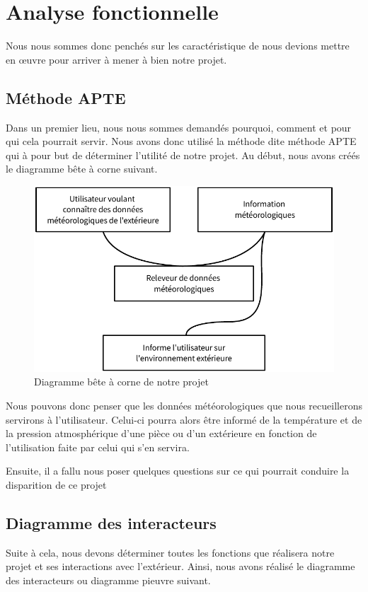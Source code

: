 \section{Analyse fonctionnelle}

Nous nous sommes donc penchés sur les caractéristique de nous devions mettre en œuvre pour arriver à mener à bien notre projet.

\subsection{Méthode APTE}

Dans un premier lieu, nous nous sommes demandés pourquoi, comment et pour qui cela pourrait servir. Nous avons donc utilisé la méthode dite \og méthode APTE \fg qui à pour but de déterminer l'utilité de notre projet. Au début, nous avons créés le diagramme bête à corne suivant.

\begin{figure}[!h]
	\centering
	\includegraphics[width=.6\linewidth]{Images/Diagramme_APTE}
	\caption{Diagramme bête à corne de notre projet}
\end{figure}

Nous pouvons donc penser que les données météorologiques que nous recueillerons servirons à l'utilisateur. Celui-ci pourra alors être informé de la température et de la pression atmosphérique d'une pièce ou d'un extérieure en fonction de l'utilisation faite par celui qui s'en servira.

Ensuite, il a fallu nous poser quelques questions sur ce qui pourrait conduire la disparition de ce projet

\subsection{Diagramme des interacteurs}

Suite à cela, nous devons déterminer toutes les fonctions que réalisera notre projet et ses interactions avec l'extérieur. Ainsi, nous avons réalisé le diagramme des interacteurs ou diagramme \og pieuvre \fg suivant.

